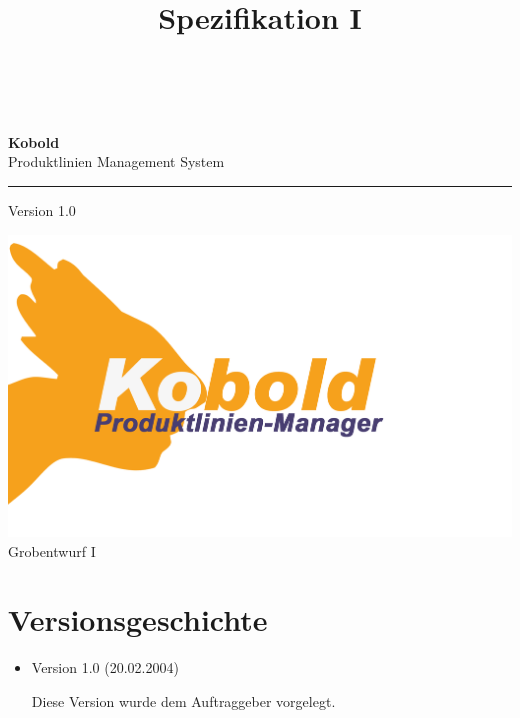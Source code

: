\documentclass[a4paper,titlepage,12pt,ngerman]{scrbook}
\title {\huge \product\\[0.5cm]\large Spezifikation I \\[0.5cm] \version
  \\[1cm] \Large \company}
\newcommand\version{Version 1.0\xspace}
\begin{document}

\begin{titlepage}
\renewcommand{\thefootnote}{\fnsymbol{footnote}}
{\Huge
\raggedright
\textbf{\bf Kobold} \\
\huge Produktlinien Management System
\rule{\textwidth}{0.75pt}
\par
}
\begin{flushleft}
\normalsize
\version
\end{flushleft}


\vfill
\includegraphics[width=15cm]{../common/logo-color.png}
\vfill
{\parindent=0cm
\Huge Grobentwurf I
}


\setcounter{footnote}{0}
\end{titlepage}


\section*{Versionsgeschichte}

\begin{itemize}

\item Version 1.0 (20.02.2004)
    
    Diese Version wurde dem Auftraggeber vorgelegt.

\end{itemize}

\tableofcontents





\appendix

\end{document}
